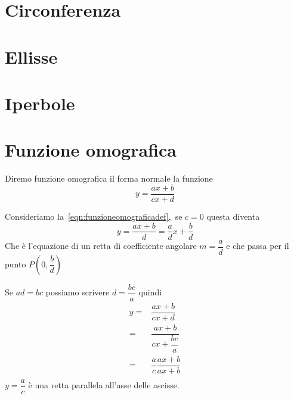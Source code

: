 \section{Circonferenza}
\section{Ellisse}
\section{Iperbole}
\section{Funzione omografica}
\begin{defn}\label{eqn:funzioneomograficadef}
Diremo funzione omografica il forma normale la funzione\begin{equation}
	y=\dfrac{ax+b}{cx+d}
\end{equation}
\end{defn}
\begin{commento}
Consideriamo la~\vref{eqn:funzioneomograficadef},\ se $c=0$ questa diventa 
\begin{equation*}
	y=\dfrac{ax+b}{d}=\dfrac{a}{d}x+\dfrac{b}{d}
\end{equation*}
Che è l'equazione di un retta di coefficiente angolare $m=\dfrac{a}{d}$ e che 
passa per il punto $P(0,\dfrac{b}{d})$

Se $ad=bc$ possiamo scrivere $d=\dfrac{bc}{a}$
quindi \begin{align*}
y=&\dfrac{ax+b}{cx+d}\\
=&\dfrac{ax+b}{cx+\dfrac{bc}{a}}\\
=&\dfrac{a}{c}\dfrac{ax+b}{ax+b}\\
\end{align*}
$y=\dfrac{a}{c}$ è una retta parallela all'asse delle ascisse.
\end{commento}